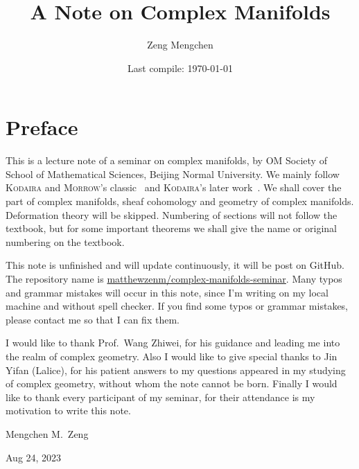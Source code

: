 \documentclass[a4paper]{book}
\title{A Note on Complex Manifolds}
\author{Zeng Mengchen}
\date{Last compile: \today}
\theoremstyle{definition}
\theoremstyle{plain}
\theoremstyle{remark}
\numberwithin{equation}{section}
\begin{document}
\maketitle
\thispagestyle{empty}

\frontmatter

\tableofcontents
\newpage
\thispagestyle{empty}

\chapter{Preface}

This is a lecture note of a seminar on complex manifolds, by OM Society of School of Mathematical Sciences, Beijing Normal University.
We mainly follow \textsc{Kodaira} and \textsc{Morrow}'s classic~\cite{Kodaira06} and \textsc{Kodaira}'s later work~\cite{Kodaira05}.
We shall cover the part of complex manifolds, sheaf cohomology and geometry of complex manifolds.
Deformation theory will be skipped.
Numbering of sections will not follow the textbook, but for some important theorems we shall give the name or original numbering on the textbook.

This note is unfinished and will update continuously, it will be post on GitHub.
The repository name is \href{https://github.com/matthewzenm/complex-manifolds-seminar}{matthewzenm/complex-manifolds-seminar}.
Many typos and grammar mistakes will occur in this note, since I'm writing on my local machine and without spell checker.
If you find some typos or grammar mistakes, please contact me so that I can fix them.

I would like to thank Prof.\ Wang Zhiwei, for his guidance and leading me into the realm of complex geometry.
Also I would like to give special thanks to Jin Yifan (Lalice), for his patient answers to my questions appeared in my studying of complex geometry, without whom the note cannot be born.
Finally I would like to thank every participant of my seminar, for their attendance is my motivation to write this note.


\begin{flushright}
    Mengchen M.\ Zeng

    Aug 24, 2023
\end{flushright}



\newpage
\thispagestyle{empty}

\mainmatter




\backmatter


\end{document}
